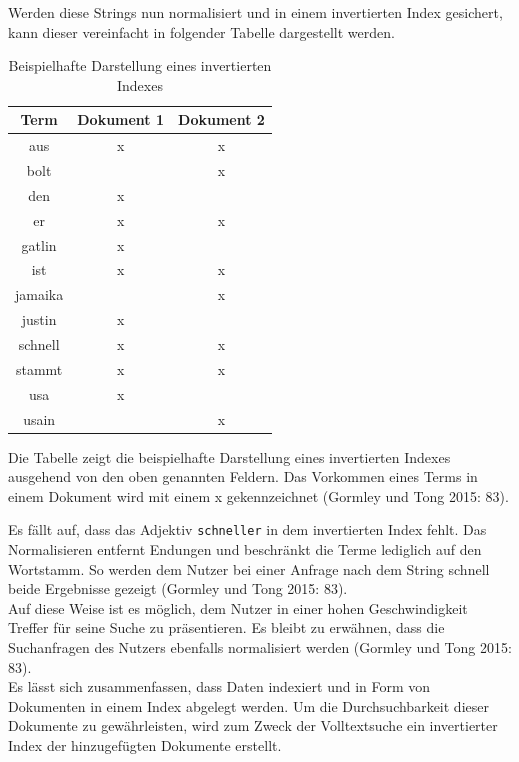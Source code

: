 \documentclass[a4paper]{scrartcl}
\begin{document}
Werden diese Strings nun normalisiert und in einem invertierten Index gesichert, kann dieser vereinfacht in folgender Tabelle dargestellt werden.

\begin{table}[htb]
	\centering
	\caption{Beispielhafte Darstellung eines invertierten Indexes}
	\begin{center}
		
		\begin{tabular}{| c | c | c |}
			\hline
			Term & Dokument 1 & Dokument 2 \\ [0.5ex]
			\hline \hline
			aus & x & x \\
			\hline
			bolt & & x \\
			\hline
			den & x & \\
			\hline
			er & x & x \\
			\hline
			gatlin & x & \\
			\hline
			ist & x & x \\
			\hline
			jamaika & & x \\
			\hline
			justin & x & \\
			\hline
			schnell & x & x \\
			\hline
			stammt & x & x \\
			\hline
			usa & x &  \\
			\hline
			usain & & x\\
			\hline
		\end{tabular}
	\end{center}
	Die Tabelle zeigt die beispielhafte Darstellung eines invertierten Indexes ausgehend von den oben genannten Feldern. Das Vorkommen eines Terms in einem Dokument wird mit einem x gekennzeichnet (Gormley und Tong 2015: 83).
\end{table}

Es fällt auf, dass das Adjektiv \texttt{schneller} in dem invertierten Index fehlt. Das Normalisieren entfernt Endungen und beschränkt die Terme lediglich auf den Wortstamm. So werden dem Nutzer bei einer Anfrage nach dem String schnell beide Ergebnisse gezeigt (Gormley und Tong 2015: 83). \\
Auf diese Weise ist es möglich, dem Nutzer in einer hohen Geschwindigkeit Treffer für seine Suche zu präsentieren. Es bleibt zu erwähnen, dass die Suchanfragen des Nutzers ebenfalls normalisiert werden (Gormley und Tong 2015: 83). \\

Es lässt sich zusammenfassen, dass Daten indexiert und in Form von Dokumenten in einem Index abgelegt werden. Um die Durchsuchbarkeit dieser Dokumente zu gewährleisten, wird zum Zweck der Volltextsuche ein invertierter Index der hinzugefügten Dokumente erstellt.
\end{document}
